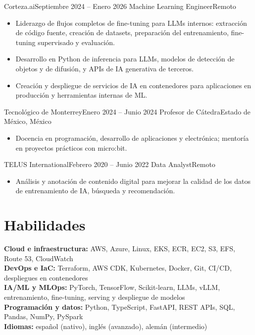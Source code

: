 \documentclass[10pt,letterpaper]{article}
\begin{document}
\entry
{Corteza.ai}{Septiembre 2024 -- Enero 2026}
{Machine Learning Engineer}{Remoto}
\begin{itemize}
  \item Liderazgo de flujos completos de fine-tuning para LLMs internos: extracción de código fuente, creación de datasets, preparación del entrenamiento, fine-tuning supervisado y evaluación.
  \item Desarrollo en Python de inferencia para LLMs, modelos de detección de objetos y de difusión, y APIs de IA generativa de terceros.
  \item Creación y despliegue de servicios de IA en contenedores para aplicaciones en producción y herramientas internas de ML.
\end{itemize}

\entry
{Tecnológico de Monterrey}{Enero 2024 -- Junio 2024}
{Profesor de Cátedra}{Estado de México, México}
\begin{itemize}
  \item Docencia en programación, desarrollo de aplicaciones y electrónica; mentoría en proyectos prácticos con micro:bit.
\end{itemize}

\entry
{TELUS International}{Febrero 2020 -- Junio 2022}
{Data Analyst}{Remoto}
\begin{itemize}
  \item Análisis y anotación de contenido digital para mejorar la calidad de los datos de entrenamiento de IA, búsqueda y recomendación.
\end{itemize}

\section*{Habilidades}
\textbf{Cloud e infraestructura:} AWS, Azure, Linux, EKS, ECR, EC2, S3, EFS, Route 53, CloudWatch \\
\textbf{DevOps e IaC:} Terraform, AWS CDK, Kubernetes, Docker, Git, CI/CD, despliegues en contenedores \\
\textbf{IA/ML y MLOps:} PyTorch, TensorFlow, Scikit-learn, LLMs, vLLM, entrenamiento, fine-tuning, serving y despliegue de modelos \\
\textbf{Programación y datos:} Python, TypeScript, FastAPI, REST APIs, SQL, Pandas, NumPy, PySpark \\
\textbf{Idiomas:} español (nativo), inglés (avanzado), alemán (intermedio)

\end{document}
